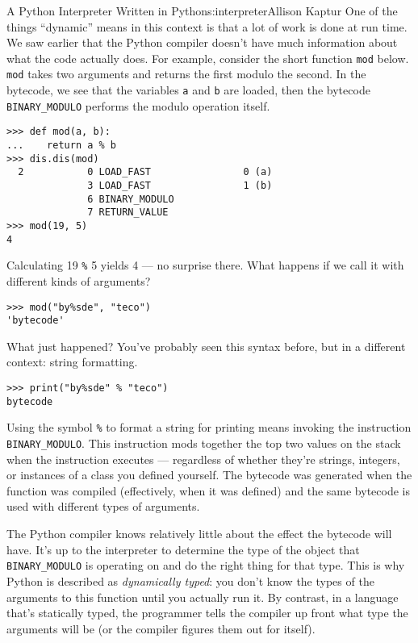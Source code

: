 \begin{aosachapter}{A Python Interpreter Written in Python}{s:interpreter}{Allison Kaptur}
One of the things ``dynamic'' means in this context is that a lot of
work is done at run time. We saw earlier that the Python compiler
doesn't have much information about what the code actually does. For
example, consider the short function \texttt{mod} below. \texttt{mod}
takes two arguments and returns the first modulo the second. In the
bytecode, we see that the variables \texttt{a} and \texttt{b} are
loaded, then the bytecode \texttt{BINARY\_MODULO} performs the modulo
operation itself.

\begin{verbatim}
>>> def mod(a, b):
...    return a % b
>>> dis.dis(mod)
  2           0 LOAD_FAST                0 (a)
              3 LOAD_FAST                1 (b)
              6 BINARY_MODULO
              7 RETURN_VALUE
>>> mod(19, 5)
4
\end{verbatim}

Calculating 19 \texttt{\%} 5 yields 4 --- no surprise there. What
happens if we call it with different kinds of arguments?

\begin{verbatim}
>>> mod("by%sde", "teco")
'bytecode'
\end{verbatim}

What just happened? You've probably seen this syntax before, but in a
different context: string formatting.

\begin{verbatim}
>>> print("by%sde" % "teco")
bytecode
\end{verbatim}

Using the symbol \texttt{\%} to format a string for printing means
invoking the instruction \texttt{BINARY\_MODULO}. This instruction mods
together the top two values on the stack when the instruction executes
--- regardless of whether they're strings, integers, or instances of a
class you defined yourself. The bytecode was generated when the function
was compiled (effectively, when it was defined) and the same bytecode is
used with different types of arguments.

The Python compiler knows relatively little about the effect the
bytecode will have. It's up to the interpreter to determine the type of
the object that \texttt{BINARY\_MODULO} is operating on and do the right
thing for that type. This is why Python is described as
\emph{dynamically typed}: you don't know the types of the arguments to
this function until you actually run it. By contrast, in a language
that's statically typed, the programmer tells the compiler up front what
type the arguments will be (or the compiler figures them out for
itself).


\end{aosachapter}
